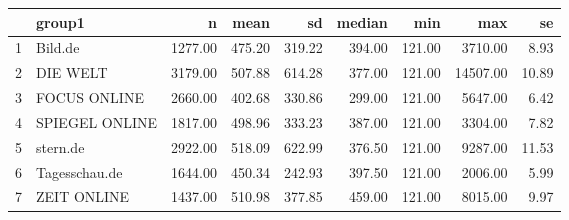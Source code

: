 \begin{table}[ht]
\centering
\begin{tabular}{rlrrrrrrr}
  \hline
 & group1 & n & mean & sd & median & min & max & se \\ 
  \hline
1 & Bild.de & 1277.00 & 475.20 & 319.22 & 394.00 & 121.00 & 3710.00 & 8.93 \\ 
  2 & DIE WELT & 3179.00 & 507.88 & 614.28 & 377.00 & 121.00 & 14507.00 & 10.89 \\ 
  3 & FOCUS ONLINE & 2660.00 & 402.68 & 330.86 & 299.00 & 121.00 & 5647.00 & 6.42 \\ 
  4 & SPIEGEL ONLINE & 1817.00 & 498.96 & 333.23 & 387.00 & 121.00 & 3304.00 & 7.82 \\ 
  5 & stern.de & 2922.00 & 518.09 & 622.99 & 376.50 & 121.00 & 9287.00 & 11.53 \\ 
  6 & Tagesschau.de & 1644.00 & 450.34 & 242.93 & 397.50 & 121.00 & 2006.00 & 5.99 \\ 
  7 & ZEIT ONLINE & 1437.00 & 510.98 & 377.85 & 459.00 & 121.00 & 8015.00 & 9.97 \\ 
   \hline
\end{tabular}
\end{table}
